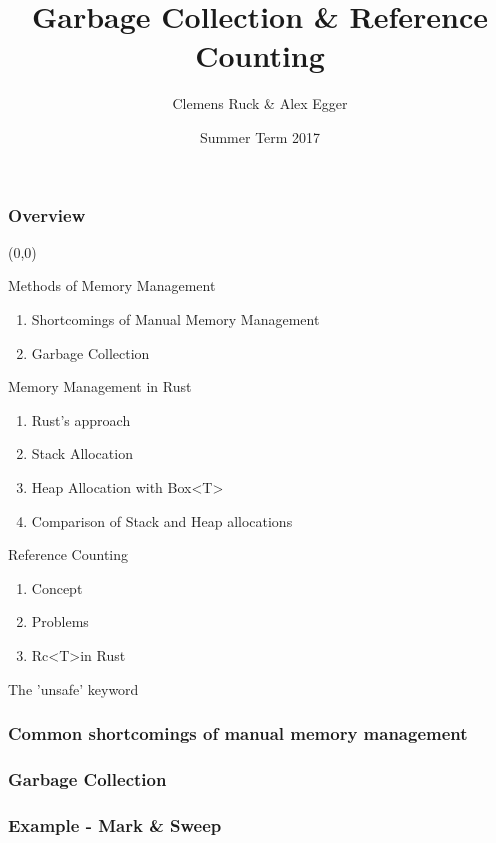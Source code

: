 \documentclass{beamer}
\title{Garbage Collection \& Reference Counting}
\author{Clemens Ruck \& Alex Egger}
\institute[TUM]{
\vspace{-19em}\tumheader\vspace{18em}}
\date{Summer Term 2017}
\begin{document}

\maketitle

    \begin{frame}
        \frametitle{Overview}
		\begin{textblock}{6}(0,0)
			\begin{alertblock}{Methods of Memory Management}
				\begin{enumerate}
					\item Shortcomings of Manual Memory Management
					\item Garbage Collection
				\end{enumerate}
			\end{alertblock}
			\begin{alertblock}{Memory Management in Rust}
				\begin{enumerate}
					\item Rust's approach
					\item Stack Allocation
					\item Heap Allocation with Box\textless T\textgreater
					\item Comparison of Stack and Heap allocations
				\end{enumerate}
			\end{alertblock}
			\begin{alertblock}{Reference Counting}
				\begin{enumerate}
					\item Concept
					\item Problems 
					\item Rc\textless T\textgreater in Rust
				\end{enumerate}
			\end{alertblock}
			\begin{alertblock}{The 'unsafe' keyword}
			\end{alertblock}
		\end{textblock}
    \end{frame}
    \begin{frame}
        \frametitle{Common shortcomings of manual memory management}
    \end{frame}
    \begin{frame}		
		\frametitle{Garbage Collection}
    \end{frame}
	\begin{frame}
		\frametitle{Example - Mark \& Sweep}
	\end{frame}
\end{document}
